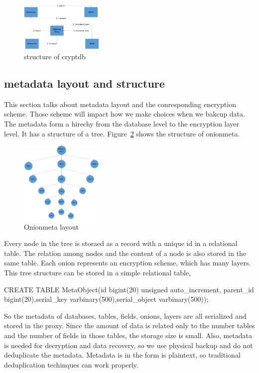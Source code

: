 \begin{figure}[tb]
\centering
\includegraphics[width=4cm]{images/Cryptdb.png}
\caption{structure of cryptdb}
\label{fig:stack1}
\end{figure}



\subsection{metadata layout and structure}

This section talks about metadata layout and the conresponding encryption scheme. Those scheme will impact how we make choices when we bakcup data. The metadata form a hirechy from the database level to the encryption layer level. It has a structure of a tree. Figure~\ref{fig:stack2} shows the structure of onionmeta.


\begin{figure}[tb]
\centering
\includegraphics[width=4cm]{images/layers.png}
\caption{Onionmeta layout}
\label{fig:stack2}
\end{figure}

Every node in the tree is storaed as a record with a unique id in a relational table. The relation among nodes and the content of a node is also stored in the same table. Each onion represents an encryption scheme, which has many layers. This tree structure can be stored in a simple relational table, 

CREATE TABLE MetaObject(id bigint(20) unsigned auto\_increment, parent\_id bigint(20),serial\_key varbinary(500),serial\_object varbinary(500));  


So the metadata of databases, tables, fields, onions, layers are all serialized and stored in the proxy. Since the amount of data is related only to the number tables and the number of fields in those tables, the storage size is small. Also, metadata is needed for decryption and data recovery, so we use physical backup and do not deduplicate the metadata. Metadata is in the form is plaintext, so traditional deduplication techinques can work properly.



